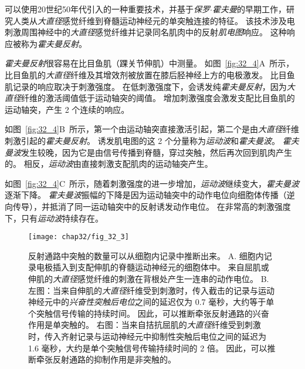 \begin{proposition}[霍夫曼反射] \label{box:32_3}
	
	\quad \quad 可以使用20世纪50年代引入的一种重要技术，并基于\textit{保罗$\cdot$霍夫曼}的早期工作，研究人类从\textit{大直径}感觉纤维到脊髓运动神经元的单突触连接的特征。
	该技术涉及电刺激周围神经中的\textit{大直径}感觉纤维并记录同名肌肉中的反射\textit{肌电图}响应。
	这种响应被称为\textit{霍夫曼反射}。
	
	\quad \quad \textit{霍夫曼反射}很容易在比目鱼肌（踝关节伸肌）中测量。
	如图~\ref{fig:32_4}A~所示，比目鱼肌的\textit{大直径}纤维及其增效剂被放置在膝后胫神经上方的电极激发。
	比目鱼肌记录的响应取决于刺激强度。
	在低刺激强度下，会诱发纯\textit{霍夫曼反射}，因为\textit{大直径}纤维的激活阈值低于运动轴突的阈值。
	增加刺激强度会激发支配比目鱼肌的运动轴突，产生 2 个连续的响应。
	
	\quad \quad 如图~\ref{fig:32_4}B~所示，第一个由运动轴突直接激活引起，第二个是由\textit{大直径}纤维刺激引起的\textit{霍夫曼反射}。
	诱发肌电图的这 2 个分量称为\textit{运动波}和\textit{霍夫曼波}。
	\textit{霍夫曼波}发生较晚，因为它是由信号传播到脊髓，穿过突触，然后再次回到肌肉产生的。
	相反，\textit{运动波}由直接刺激支配肌肉的运动轴突产生。
	
	\quad \quad 如图~\ref{fig:32_4}C~所示，随着刺激强度的进一步增加，\textit{运动波}继续变大，\textit{霍夫曼波}逐渐下降。
	\textit{霍夫曼波}振幅的下降是因为运动轴突中的动作电位向细胞体传播（逆向传导），并抵消了同一运动轴突中的反射诱发动作电位。
	在非常高的刺激强度下，只有\textit{运动波}持续存在。
	
\end{proposition}


\begin{figure}[htbp]
	\centering
	\texttt{[image: chap32/fig\_32\_3]}
	\caption{反射通路中突触的数量可以从细胞内记录中推断出来。
		A. 细胞内记录电极插入到支配伸肌的脊髓运动神经元的细胞体中。
		来自屈肌或伸肌的\textit{大直径}感觉纤维的刺激在背根处产生一连串的动作电位。
		B. 左图：当来自伸肌的\textit{大直径}纤维受到刺激时，传入截击的记录与运动神经元中的\textit{兴奋性突触后电位}之间的延迟仅为 0.7 毫秒，大约等于单个突触信号传输的持续时间。
		因此，可以推断牵张反射通路的兴奋作用是单突触的。
		右图：当来自拮抗屈肌的\textit{大直径}纤维受到刺激时，传入齐射记录与运动神经元中抑制性突触后电位之间的延迟为 1.6 毫秒，大约是单个突触信号传输持续时间的 2 倍。
		因此，可以推断牵张反射通路的抑制作用是非突触的。}
	\label{fig:32_3}
\end{figure}



